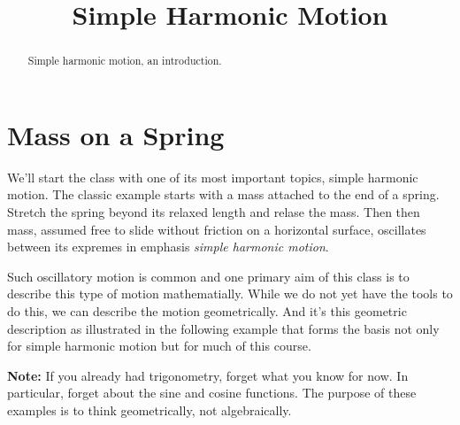 \documentclass{ximera}
\title{Simple Harmonic Motion}
\begin{document}
\begin{abstract}
Simple harmonic motion, an introduction.
\end{abstract}
\maketitle

\section{Mass on a Spring}

We'll start the class with one of its most important topics, simple harmonic motion. The classic example starts with a mass attached to the end of a spring. Stretch the spring beyond its relaxed length and relase the mass. Then then mass, assumed free to slide without friction on a horizontal surface, oscillates between its expremes in emphasis \emph{simple harmonic motion}.

Such oscillatory motion is common and one primary aim of this class is to describe this type of motion mathematially. While we do not yet have the tools to do this, we can describe the motion geometrically. And it's this geometric description as illustrated in the following example that forms the basis not only for simple harmonic motion but for much of this course.

{\bf Note:} If you already had trigonometry, forget what you know for now. In particular, forget about the sine and cosine functions. The purpose of these examples is to think geometrically, not algebraically.
\end{document}
